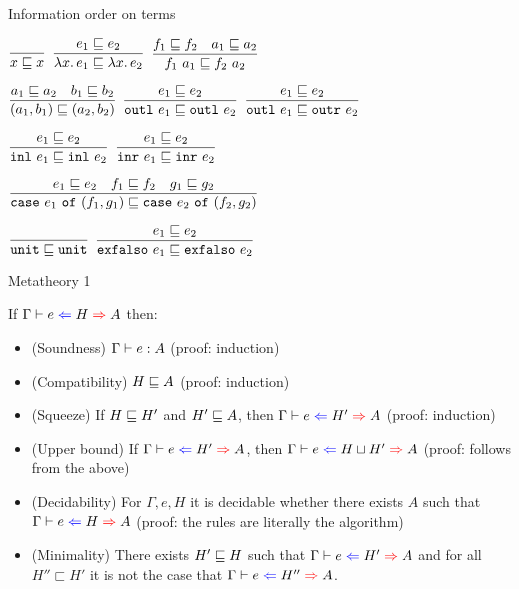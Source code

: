 \documentclass{beamer}
\begin{document}
\begin{frame}{Information order on terms}

\begin{center}
  $\displaystyle \frac{}{x \sqsubseteq x} \textsc{\footnotesize{}}$ \quad
  $\displaystyle \frac{e_1 \sqsubseteq e_2}{\lambda x.\, e_1 \sqsubseteq \lambda x.\, e_2} \textsc{\footnotesize{}}$ \quad
  $\displaystyle \frac{f_1 \sqsubseteq f_2 \quad a_1 \sqsubseteq a_2}{f_1\ a_1 \sqsubseteq f_2\ a_2} \textsc{\footnotesize{}}$

  \vspace{2em}

  $\displaystyle \frac{a_1 \sqsubseteq a_2 \quad b_1 \sqsubseteq b_2}{(a_1, b_1) \sqsubseteq (a_2, b_2)} \textsc{\footnotesize{}}$ \quad
  $\displaystyle \frac{e_1 \sqsubseteq e_2}{\texttt{outl}\ e_1 \sqsubseteq \texttt{outl}\ e_2} \textsc{\footnotesize{}}$ \quad
  $\displaystyle \frac{e_1 \sqsubseteq e_2}{\texttt{outl}\ e_1 \sqsubseteq \texttt{outr}\ e_2} \textsc{\footnotesize{}}$

  \vspace{2em}

  $\displaystyle \frac{e_1 \sqsubseteq e_2}{\texttt{inl}\ e_1 \sqsubseteq \texttt{inl}\ e_2} \textsc{\footnotesize{}}$ \quad
  $\displaystyle \frac{e_1 \sqsubseteq e_2}{\texttt{inr}\ e_1 \sqsubseteq \texttt{inr}\ e_2} \textsc{\footnotesize{}}$

  \vspace{2em}

  $\displaystyle \frac{e_1 \sqsubseteq e_2 \quad f_1 \sqsubseteq f_2 \quad g_1 \sqsubseteq g_2}{\texttt{case}\ e_1\ \texttt{of}\ (f_1, g_1) \sqsubseteq \texttt{case}\ e_2\ \texttt{of}\ (f_2, g_2)} \textsc{\footnotesize{}}$

  \vspace{2em}

  $\displaystyle \frac{}{\texttt{unit} \sqsubseteq \texttt{unit}} \textsc{\footnotesize{}}$ \quad
  $\displaystyle \frac{e_1 \sqsubseteq e_2}{\texttt{exfalso}\ e_1 \sqsubseteq \texttt{exfalso}\ e_2} \textsc{\footnotesize{}}$
\end{center}

\end{frame}

\begin{frame}{Metatheory 1}

If $\fullhinting{\Gamma}{e}{H}{A}$ then:

\begin{itemize}
  \item (Soundness) $\Gamma \vdash e : A$ (proof: induction)
  \item (Compatibility) $H \sqsubseteq A$ (proof: induction)
  \item (Squeeze) If $H \sqsubseteq H'$ and $H' \sqsubseteq A$, then $\fullhinting{\Gamma}{e}{H'}{A}$ (proof: induction)
  \item (Upper bound) If $\fullhinting{\Gamma}{e}{H'}{A}$, then $\fullhinting{\Gamma}{e}{\combinehints{H}{H'}}{A}$ (proof: follows from the above)
  \item (Decidability) For $\Gamma, e, H$ it is decidable whether there exists $A$ such that $\fullhinting{\Gamma}{e}{H}{A}$ (proof: the rules are literally the algorithm)
  \item (Minimality) There exists $H' \sqsubseteq H$ such that $\fullhinting{\Gamma}{e}{H'}{A}$ and for all $H'' \sqsubset H'$ it is not the case that $\fullhinting{\Gamma}{e}{H''}{A}$.
\end{itemize}

\end{frame}
\end{document}
